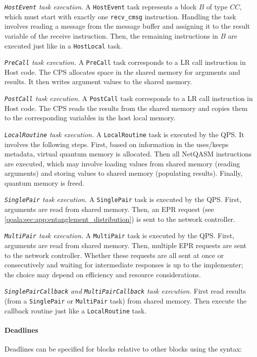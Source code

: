 \textit{\texttt{HostEvent} task execution}. A \texttt{HostEvent} task represents a block $B$ of type $CC$, which must start with exactly one \texttt{recv\_cmsg} instruction. Handling the task involves reading a message from the message buffer and assigning it to the result variable of the receive instruction. Then, the remaining instructions in $B$ are executed just like in a \texttt{HostLocal} task.


\textit{\texttt{PreCall} task execution.} A \texttt{PreCall} task corresponds to a LR call instruction in Host code. The CPS allocates space in the shared memory for arguments and results. It then writes argument values to the shared memory.

\textit{\texttt{PostCall} task execution.} A \texttt{PostCall} task corresponds to a LR call instruction in Host code. The CPS reads the results from the shared memory and copies them to the corresponding variables in the host local memory.

\textit{\texttt{LocalRoutine} task execution.} A \texttt{LocalRoutine} task is executed by the QPS. It involves the following steps. First, based on information in the uses/keeps metadata, virtual quantum memory is allocated. Then all NetQASM instructions are executed, which may involve loading values from shared memory (reading arguments) and storing values to shared memory (populating results). Finally, quantum memory is freed.

\textit{\texttt{SinglePair} task execution.} A \texttt{SinglePair} task is executed by the QPS. First, arguments are read from shared memory. Then, an EPR request (see \cref{qoala:sec:app:entanglement_distribution}) is sent to the network controller.

\textit{\texttt{MultiPair} task execution.} A \texttt{MultiPair} task is executed by the QPS. First, arguments are read from shared memory. Then, multiple EPR requests are sent to the network controller. Whether these requests are all sent at once or consecutively and waiting for intermediate responses is up to the implementer; the choice may depend on efficiency and resource considerations.

\textit{\texttt{SinglePairCallback} and \texttt{MultiPairCallback} task execution.} First read results (from a \texttt{SinglePair} or \texttt{MultiPair} task) from shared memory. Then execute the callback routine just like a \texttt{LocalRoutine} task.

\paragraph{Deadlines}
Deadlines can be specified for blocks relative to other blocks using the syntax:


